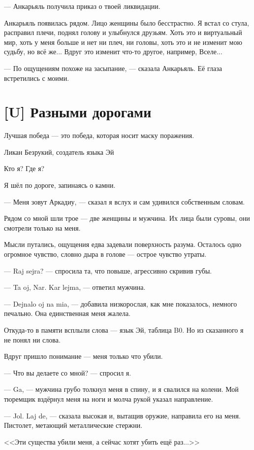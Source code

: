 --- Анкарьяль получила приказ о твоей ликвидации.

Анкарьяль появилась рядом.
Лицо женщины было бесстрастно.
Я встал со стула, расправил плечи, поднял голову и улыбнулся друзьям.
Хоть это и виртуальный мир, хоть у меня больше и нет ни плеч, ни головы, хоть это и не изменит мою судьбу, но всё же...
Вдруг это изменит что-то другое, например, Вселе...

--- По ощущениям похоже на засыпание, --- сказала Анкарьяль.
Её глаза встретились с моими.

\section{[U] Разными дорогами}

\epigraph
{Лучшая победа --- это победа, которая носит маску поражения.}
{Ликан Безрукий, создатель языка Эй}

Кто я?
Где я?

Я шёл по дороге, запинаясь о камни.

--- Меня зовут Аркадиу, --- сказал я вслух и сам удивился собственным словам.

Рядом со мной шли трое --- две женщины и мужчина.
Их лица были суровы, они смотрели только на меня.

Мысли путались, ощущения едва задевали поверхность разума.
Осталось одно огромное чувство, словно дыра в голове --- острое чувство утраты.

--- Raj sejra? --- спросила та, что повыше, агрессивно скривив губы.

--- Ta oj, Nar.
Kar lejma, --- ответил мужчина.

--- Dejnalo oj na mia, --- добавила низкорослая, как мне показалось, немного печально.
Она единственная меня жалела.

Откуда-то в памяти всплыли слова --- язык Эй, таблица B0.
Но из сказанного я не понял ни слова.

Вдруг пришло понимание --- меня только что убили.

--- Что вы делаете со мной? --- спросил я.

--- Ga, --- мужчина грубо толкнул меня в спину, и я свалился на колени.
Мой тюремщик вздёрнул меня на ноги и молча рукой указал направление.

--- Jol.
Laj de, --- сказала высокая и, вытащив оружие, направила его на меня.
Пистолет, метающий металлические стержни.

<<Эти существа убили меня, а сейчас хотят убить ещё раз...>>

